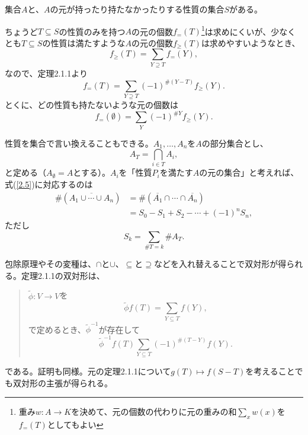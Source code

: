 \documentclass[xelatex,ja=standard,a4paper,14pt,everyparhook=compat]{bxjsarticle}
\newcommand{\inv}[1]{#1^{-1}}
\theoremstyle{definition}
\begin{document}
集合$A$と、$A$の元が持ったり持たなかったりする性質の集合$S$がある。

ちょうど$T \subseteq S$の性質のみを持つ$A$の元の個数$f_=(T)$\footnote{重み$w:A \to K$を決めて、元の個数の代わりに元の重みの和$\sum_x w(x)$を$f_=(T)$としてもよい}は求めにくいが、少なくとも$T \subseteq S$の性質は満たすような$A$の元の個数$f_\geq(T)$は求めやすいようなとき、 \begin{equation*}
    f_\geq(T) = \sum_{Y \supseteq T} f_=(Y),
\end{equation*}
なので、定理2.1.1より \begin{equation*}
    f_=(T) = \sum_{Y \supseteq T} (-1)^{\#(Y-T)} f_\geq(Y).
\end{equation*}
とくに、どの性質も持たないような元の個数は \begin{equation} \label{2.5}
    f_=(\emptyset) = \sum_{Y} (-1)^{\#Y} f_\geq(Y).
\end{equation}

性質を集合で言い換えることもできる。$A_1,\ldots,A_n$を$A$の部分集合とし、 \begin{equation*}
    A_T = \bigcap_{i \in T} A_i,
\end{equation*}
と定める（$A_\emptyset = A$とする）。$A_i$を「性質$P_i$を満たす$A$の元の集合」と考えれば、式(\ref{2.5})に対応するのは \begin{align*}
    \#(\overline{A_1 \cup \cdots \cup A_n})
     & = \#(\overline{A_1} \cap \cdots \cap \overline{A_n}) \\
     & = S_0 - S_1 + S_2 - \cdots + (-1)^n S_n,
\end{align*}
ただし \begin{equation*}
    S_k = \sum_{\#T = k} \#A_T.
\end{equation*}

包除原理やその変種は、$\cap$と$\cup$、$\subseteq$と$\supseteq$などを入れ替えることで双対形が得られる。定理2.1.1の双対形は、 \begin{quote}
    $\widetilde\phi : V \to V$を \begin{equation*}
        \widetilde\phi f(T) = \sum_{Y \subseteq T} f(Y),
    \end{equation*}
    で定めるとき、$\inv{\widetilde\phi}$が存在して \begin{equation*}
        \inv{\widetilde\phi} f(T) \sum_{Y \subseteq T} (-1)^{\#(T-Y)} f(Y).
    \end{equation*}
\end{quote}
である。証明も同様。元の定理2.1.1について$g(T) \mapsto f(S-T)$を考えることでも双対形の主張が得られる。
\end{document}
